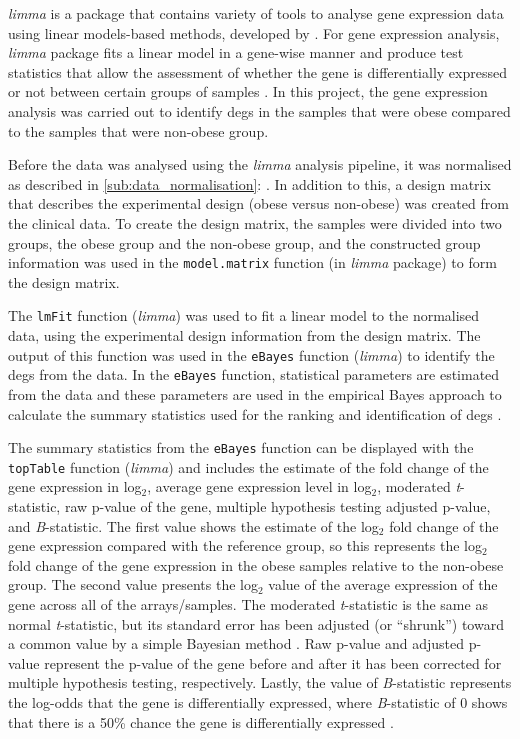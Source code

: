 \textit{limma} is a package that contains variety of tools to analyse gene expression data using linear models-based methods, developed by \citet{Ritchie2015}.
For gene expression analysis, \textit{limma} package fits a linear model in a gene-wise manner and produce test statistics that allow the assessment of whether the gene is differentially expressed or not between certain groups of samples \citep{Ritchie2015}.
In this project, the gene expression analysis was carried out to identify \glspl{deg} in the samples that were obese compared to the samples that were non-obese group.

Before the data was analysed using the \textit{limma} analysis pipeline, it was normalised as described in \cref{sub:data_normalisation}: .
In addition to this, a design matrix that describes the experimental design (obese versus non-obese) was created from the clinical data.
To create the design matrix, the samples were divided into two groups, the obese group and the non-obese group, and the constructed group information was used in the \texttt{model.matrix} function (in \textit{limma} package) to form the design matrix.

The \texttt{lmFit} function (\textit{limma}) was used to fit a linear model to the normalised data, using the experimental design information from the design matrix.
The output of this function was used in the \texttt{eBayes} function (\textit{limma}) to identify the \glspl{deg} from the data.
In the \texttt{eBayes} function, statistical parameters are estimated from the data and these parameters are used in the empirical Bayes approach to calculate the summary statistics used for the ranking and identification of \glspl{deg} \citep{Smyth2004}.

The summary statistics from the \texttt{eBayes} function can be displayed with the \texttt{topTable} function (\textit{limma}) and includes the estimate of the fold change of the gene expression in log$_2$, average gene expression level in log$_2$, moderated \textit{t}-statistic, raw p-value of the gene, multiple hypothesis testing adjusted p-value, and \textit{B}-statistic.
The first value shows the estimate of the log$_2$ fold change of the gene expression compared with the reference group, so this represents the log$_2$ fold change of the gene expression in the obese samples relative to the non-obese group.
The second value presents the log$_2$ value of the average expression of the gene across all of the arrays/samples.
The moderated \textit{t}-statistic is the same as normal \textit{t}-statistic, but its standard error has been adjusted (or ``shrunk'') toward a common value by a simple Bayesian method \citep{Smyth2005}.
Raw p-value and adjusted p-value represent the p-value of the gene before and after it has been corrected for multiple hypothesis testing, respectively.
Lastly, the value of \textit{B}-statistic represents the log-odds that the gene is differentially expressed, where \textit{B}-statistic of 0 shows that there is a 50\% chance the gene is differentially expressed \citep{Smyth2005}.

